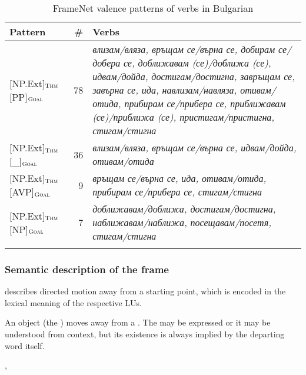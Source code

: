 \documentclass[output=paper,colorlinks,citecolor=brown]{langscibook}
\begin{document}
\begin{table}
   \begin{tabularx}{\textwidth}{ lrQ } 
   \lsptoprule
   Pattern & \# & Verbs \\ \midrule
{[NP.Ext]}$_{\text{\textsc{Thm}}}$ {[PP]}$_{\text{\textsc{Goal}}}$ & 78 & \textit{влизам\slash вляза, връщам се\slash върна се, добирам се\slash добера се, доближавам (се)\slash доближа (се), идвам\slash дойда, достигам\slash достигна, завръщам се, завърна се, ида, навлизам\slash навляза, отивам\slash отида, прибирам се\slash прибера се, приближавам (се)\slash приближа (се), пристигам\slash пристигна, стигам\slash стигна}\\ 
{[NP.Ext]}$_{\text{\textsc{Thm}}}$ {[\_]}$_{\text{\textsc{Goal}}}$ & 36 & \textit{влизам\slash вляза, връщам се\slash върна се, идвам\slash дойда, отивам\slash отида}\\ 
{[NP.Ext]}$_{\text{\textsc{Thm}}}$ {[AVP]}$_{\text{\textsc{Goal}}}$ & 9 & \textit{връщам се\slash върна се, ида, отивам\slash отида, прибирам се\slash прибера се, стигам\slash стигна}\\ 
{[NP.Ext]}$_{\text{\textsc{Thm}}}$ {[NP]}$_{\text{\textsc{Goal}}}$ & 7 & \textit{доближавам\slash доближа, достигам\slash достигна, наближавам\slash наближа, посещавам\slash посетя, стигам\slash стигна}\\ 
\lspbottomrule
\end{tabularx}
    \caption{FrameNet valence patterns of  verbs in Bulgarian}
    \label{tab:4:arriving-valence-bg}
\end{table}


\subsubsection{}

\subsubsection{Semantic description of the  frame}

 describes directed motion away from a starting point, which is encoded in the lexical meaning of the respective LUs.

\begin{description}[font=\normalfont]
\item[Definition of the frame \framename{Departing}:] An object (the ) moves away from a . The  may be expressed or it may be understood from context, but its existence is always implied by the departing word itself.

\item[Core frame elements:] , 
\end{description}
\end{document}

